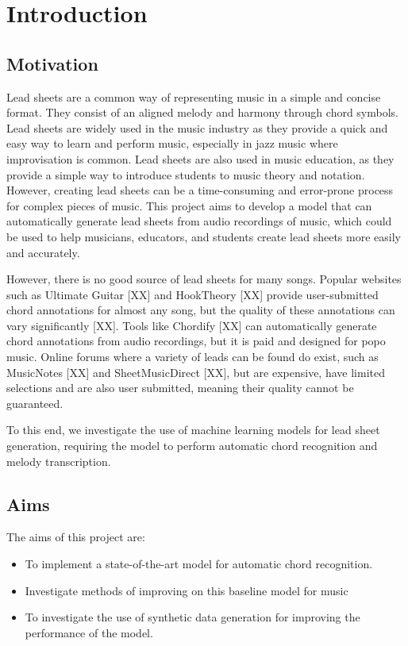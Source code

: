 \chapter{Introduction}

\section{Motivation}

Lead sheets are a common way of representing music in a simple and concise format. They consist of an aligned melody and harmony through chord symbols. Lead sheets are widely used in the music industry as they provide a quick and easy way to learn and perform music, especially in jazz music where improvisation is common. Lead sheets are also used in music education, as they provide a simple way to introduce students to music theory and notation. However, creating lead sheets can be a time-consuming and error-prone process for complex pieces of music. This project aims to develop a model that can automatically generate lead sheets from audio recordings of music, which could be used to help musicians, educators, and students create lead sheets more easily and accurately. 

However, there is no good source of lead sheets for many songs. Popular websites such as Ultimate Guitar [XX] and HookTheory [XX] provide user-submitted chord annotations for almost any song, but the quality of these annotations can vary significantly [XX]. Tools like Chordify [XX] can automatically generate chord annotations from audio recordings, but it is paid and designed for popo music. Online forums where a variety of leads can be found do exist, such as MusicNotes [XX] and SheetMusicDirect [XX], but are expensive, have limited selections and are also user submitted, meaning their quality cannot be guaranteed.

To this end, we investigate the use of machine learning models for lead sheet generation, requiring the model to perform automatic chord recognition and melody transcription.

\section{Aims}

The aims of this project are:
\begin{itemize}
    \item To implement a state-of-the-art model for automatic chord recognition.
    \item Investigate methods of improving on this baseline model for music 
    \item To investigate the use of synthetic data generation for improving the performance of the model.
\end{itemize}

